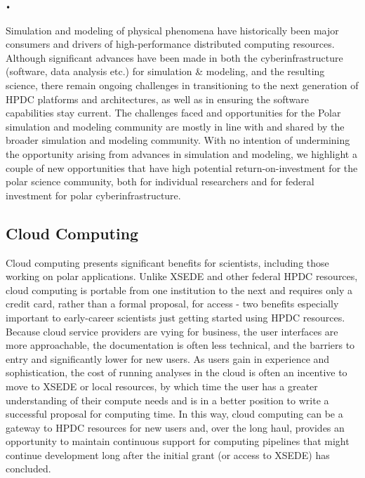 \texttt{•}\documentclass[10pt,letterpaper,draft]{article}
\begin{document}
Simulation and modeling of physical phenomena have historically been major consumers and drivers of high-performance distributed computing resources. Although significant advances have been made in both the cyberinfrastructure (software, data analysis etc.) for simulation \& modeling, and the resulting science, there remain ongoing challenges in transitioning to the next generation of HPDC platforms and architectures, as well as in ensuring the software capabilities stay current. The challenges faced and opportunities for the Polar simulation and modeling community are mostly in line with and shared by the broader simulation and modeling community. With no intention of undermining the opportunity arising from advances in simulation and modeling, we highlight a couple of new opportunities that have high potential return-on-investment for the polar science community, both for individual researchers and for federal investment for polar cyberinfrastructure.

\subsection{Cloud Computing}

Cloud computing presents significant benefits for scientists, including those working on polar applications. Unlike XSEDE and other federal HPDC resources, cloud computing is portable from one institution to the next and requires only a credit card, rather than a formal proposal, for access - two benefits especially important to early-career scientists just getting started using HPDC resources. Because cloud service providers are vying for business, the user interfaces are more approachable, the documentation is often less technical, and the barriers to entry and significantly lower for new users. As users gain in experience and sophistication, the cost of running analyses in the cloud is often an incentive to move to XSEDE or local resources, by which time the user has a greater understanding of their compute needs and is in a better position to write a successful proposal for computing time. In this way, cloud computing can be a gateway to HPDC resources for new users and, over the long haul, provides an opportunity to maintain continuous support for computing pipelines that might continue development long after the initial grant (or access to XSEDE) has concluded. 
\end{document}
